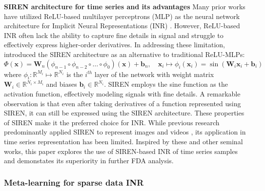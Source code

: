 \documentclass{article}
\begin{document}
\textbf{SIREN architecture for time series and its advantages}
Many prior works have utilized ReLU-based multilayer perceptrons (MLP) as the neural network architecture for Implicit Neural Representations (INR) \cite{genova2019learning,park2019deepsdf}. 
However, ReLU-based INR often lack the ability to capture fine details in signal and struggle to effectively express higher-order derivatives.
In addressing these limitation, \cite{sitzmann2020implicit} introduced the SIREN architecture as an alternative to traditional ReLU-MLPs:
$$
\Phi(\mathbf{x})=\mathbf{W}_n\left(\phi_{n-1} \circ \phi_{n-2} \circ \ldots \circ \phi_0\right)(\mathbf{x})+\mathbf{b}_n, \quad \mathbf{x}_i \mapsto \phi_i\left(\mathbf{x}_i\right)=\sin \left(\mathbf{W}_i \mathbf{x}_i+\mathbf{b}_i\right)
$$
where $\phi_i: \mathbb{R}^{M_i} \mapsto \mathbb{R}^{N_i}$ is the $i^{t h}$ layer of the network with weight matrix $\mathbf{W}_i \in \mathbb{R}^{N_i \times M_i}$ and biases $\mathbf{b}_i \in \mathbb{R}^{N_i}$.
SIREN employs the sine function as the activation function, effectively modeling signals with fine details.
A remarkable observation is that even after taking derivatives of a function represented using SIREN, 
it can still be expressed using the SIREN architecture. 
These properties of SIREN make it the preferred choice for INR.
While previous research predominantly applied SIREN to represent images and videos \cite{lee2021meta}, its application in time series representation has been limited. 
Inspired by these and other seminal works, this paper explores the use of SIREN-based INR of time series samples and demonstates its superiority in further FDA analysis.


\subsubsection{Meta-learning for sparse data INR}
\end{document}
